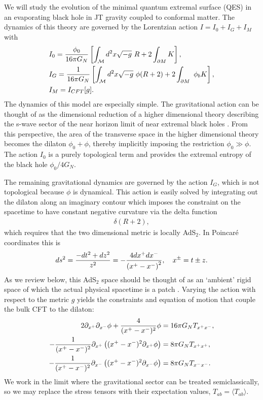 \documentclass[12pt]{article}
\newcommand{\lan}{\langle}
\newcommand{\ran}{\rangle}
\begin{document}
We will study the evolution of the minimal quantum extremal surface (QES) in an evaporating black hole in JT gravity coupled to conformal matter. The dynamics of this theory are governed by the Lorentzian action $I = I_0 + I_G + I_M$ with
\begin{align}
&I_0 = {\phi_0 \over 16 \pi G_N} \left[ \int_{\cal M} d^2 x \sqrt{-g} \  R  + 2\int_{\partial M}  K \right], \\
&I_G = {1\over 16 \pi G_N} \left[ \int_{\cal M} d^2 x \sqrt{-g} \  \phi (R + 2)  + 2\int_{\partial M} \  \phi_b  K \right],  \\
&I_M =  I_{CFT}[g].
\end{align}
The dynamics of this model are especially simple. The gravitational action can be thought of as the dimensional reduction of a higher dimensional theory describing the s-wave sector of the near horizon limit of near extremal black holes \cite{Maldacena:2016upp, Engelsoy:2016xyb, Almheiri:2016fws, Sachdev:2019bjn}. From this perspective, the area of the transverse space in the higher dimensional theory becomes the dilaton $ \phi_0 + \phi$, thereby implicitly imposing the restriction $\phi_0 \gg \phi$. The action $I_0$ is a purely topological term and provides the extremal entropy of the black hole ${\phi_0 / 4 G_N}$.

The remaining gravitational dynamics are governed by the action $I_G$, which is not topological because $\phi$ is dynamical. This action is easily solved by integrating out the dilaton along an imaginary contour which imposes the constraint on the spacetime to have constant negative curvature via the delta function
\begin{align}
\delta (R+2),
\end{align}
which requires that the two dimensional metric is locally AdS$_2$. In Poincar\'e coordinates this is
\begin{align}
ds^2 = {-dt^2 + dz^2 \over z^2} = - {4 dx^+ dx^- \over \left( x^+ - x^- \right)^2}, \ \ \ x^\pm = t \pm z.
\end{align}
As we review below, this AdS$_2$ space should be thought of as an `ambient' rigid space of which the actual physical spacetime is a patch \cite{Almheiri:2014cka, Maldacena:2016upp, Engelsoy:2016xyb, Jensen:2016pah}. Varying the action with respect to the metric $g$ yields the constraints and equation of motion that couple the bulk CFT to the dilaton:
\begin{subequations}
\begin{align}
2 \partial_{x^+} \partial_{x^-} \phi + {4 \over (x^+ - x^-)^2} \phi &= 16 \pi G_N T_{x^+ x^-}, \\
-{1 \over (x^+ - x^-)^2} \partial_{x^+} \left( (x^+ - x^-)^2 \partial_{x^+} \phi \right) &= 8 \pi G_N T_{x^+ x^+}, \\
-{1 \over (x^+ - x^-)^2} \partial_{x^-} \left( (x^+ - x^-)^2 \partial_{x^-} \phi \right) &= 8 \pi G_N T_{x^- x^-}. \label{eom}
\end{align}
\end{subequations}
We work in the limit where the gravitational sector can be treated semiclassically, so we may replace the stress tensors with their expectation values, $T_{a b} = \lan T_{ab} \ran$.
\end{document}
